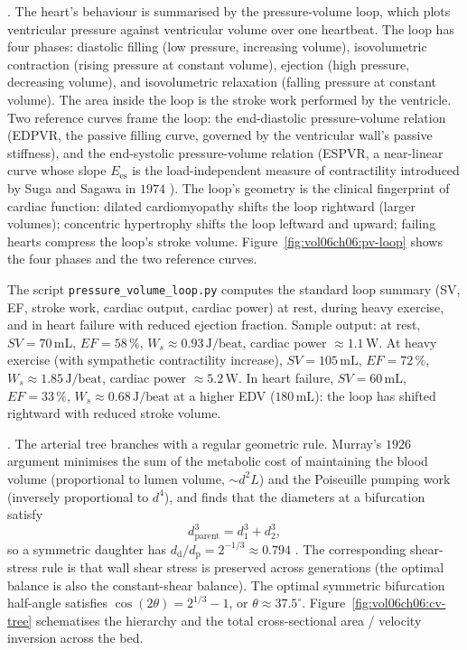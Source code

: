 . The heart's behaviour is summarised by
the pressure-volume loop, which plots ventricular pressure against
ventricular volume over one heartbeat. The loop has four phases:
diastolic filling (low pressure, increasing volume), isovolumetric
contraction (rising pressure at constant volume), ejection (high
pressure, decreasing volume), and isovolumetric relaxation (falling
pressure at constant volume). The area inside the loop is the
stroke work performed by the ventricle. Two reference curves frame
the loop: the end-diastolic pressure-volume relation (EDPVR, the
passive filling curve, governed by the ventricular wall's
passive stiffness), and the end-systolic pressure-volume relation
(ESPVR, a near-linear curve whose slope $E_{\text{es}}$ is the
load-independent measure of contractility introduced by Suga and
Sagawa in $1974$
\cite[p.~122]{paper:v6c06-suga-sagawa-1974}). The loop's geometry is
the clinical fingerprint of cardiac function: dilated
cardiomyopathy shifts the loop rightward (larger volumes); concentric
hypertrophy shifts the loop leftward and upward; failing hearts
compress the loop's stroke volume.
Figure~\ref{fig:vol06ch06:pv-loop} shows the four phases and the
two reference curves.



The script \texttt{pressure\_volume\_loop.py} computes the standard
loop summary (SV, EF, stroke work, cardiac output, cardiac power) at
rest, during heavy exercise, and in heart failure with reduced
ejection fraction. Sample output: at rest, $SV = 70\,\text{mL}$,
$EF = 58\,\%$, $W_s \approx 0.93\,\text{J/beat}$, cardiac power
$\approx 1.1\,\text{W}$. At heavy exercise (with sympathetic
contractility increase), $SV = 105\,\text{mL}$, $EF = 72\,\%$,
$W_s \approx 1.85\,\text{J/beat}$, cardiac power
$\approx 5.2\,\text{W}$. In heart failure, $SV = 60\,\text{mL}$,
$EF = 33\,\%$, $W_s \approx 0.68\,\text{J/beat}$ at a higher EDV
($180\,\text{mL}$): the loop has shifted rightward with reduced
stroke volume.

. The arterial tree
branches with a regular geometric rule. Murray's $1926$ argument
minimises the sum of the metabolic cost of maintaining the blood
volume (proportional to lumen volume, $\sim d^2 L$) and the
Poiseuille pumping work (inversely proportional to $d^4$), and finds
that the diameters at a bifurcation satisfy
\[
d_{\text{parent}}^3 = d_1^3 + d_2^3,
\]
so a symmetric daughter has $d_{\text{d}}/d_{\text{p}} =
2^{-1/3} \approx 0.794$
\cite[p.~209]{paper:v6c06-murray-1926}. The corresponding
shear-stress rule is that wall shear stress is preserved across
generations (the optimal balance is also the constant-shear
balance). The optimal symmetric bifurcation half-angle satisfies
$\cos(2\theta) = 2^{1/3} - 1$, or $\theta \approx 37.5^{\circ}$.
Figure~\ref{fig:vol06ch06:cv-tree} schematises the hierarchy and the
total cross-sectional area / velocity inversion across the bed.


